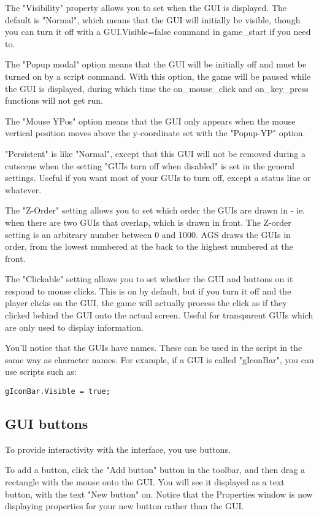 The "Visibility" property allows you to set when the GUI is displayed. The
default is "Normal", which means that the GUI will initially be visible,
though you can turn it off with a GUI.Visible=false command in game_start if you need to.

The "Popup modal" option means that the GUI will be initially
off and must be turned on by a script command. With this option,
the game will be paused while the GUI is displayed, during which time the
on_mouse_click  and  on_key_press  functions will not get run.

The "Mouse YPos" option means that the GUI only appears when the mouse vertical
position moves above the y-coordinate set with the "Popup-YP" option.

"Persistent" is like "Normal", except that this GUI will not be removed
during a cutscene when the setting "GUIs turn off when disabled" is set in
the general settings. Useful if you want most of your GUIs to turn off, except
a status line or whatever.

The "Z-Order" setting allows you to set which order the GUIs are drawn in - ie. when
there are two GUIs that overlap, which is drawn in front. The Z-order setting is an
arbitrary number between 0 and 1000. AGS draws the GUIs in order, from the lowest numbered
at the back to the highest numbered at the front.

The "Clickable" setting allows you to set whether the GUI and buttons on it
respond to mouse clicks. This is on by default, but if you turn it off and
the player clicks on the GUI, the game will actually process the click as if
they clicked behind the GUI onto the actual screen. Useful for transparent GUIs
which are only used to display information.

You'll notice that the GUIs have names. These can be used in the script in the
same way as character names. For example, if a GUI is called "gIconBar", you can use
scripts such as:

\verb$gIconBar.Visible = true;$


\subsection{GUI buttons}%

To provide interactivity with the interface, you use buttons.

To add a button, click the "Add button" button in the toolbar, and then drag a rectangle
with the mouse onto the GUI. You will see it displayed as a text button, with
the text "New button" on. Notice that the Properties window is now displaying
properties for your new button rather than the GUI.

